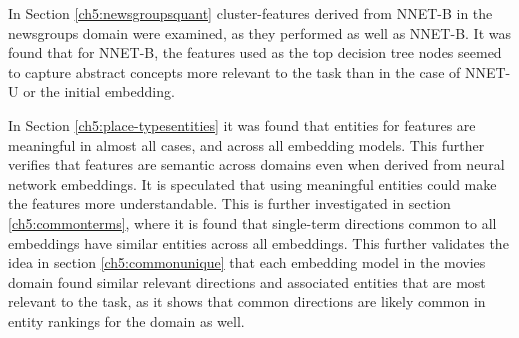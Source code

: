 In Section \ref{ch5:newsgroupsquant} cluster-features derived from NNET-B in the newsgroups domain were examined, as they performed as well as NNET-B. It was found that for NNET-B, the features used as the top decision tree nodes seemed to capture abstract concepts more relevant to the task than in the case of NNET-U or the initial embedding.

In Section \ref{ch5:place-typesentities} it was found that entities for features are meaningful in almost all cases, and across all embedding models. This further verifies that features are semantic across domains even when derived from neural network embeddings. It is speculated that using meaningful entities could make the features more understandable. This is further investigated in section \ref{ch5:commonterms}, where it is found that single-term directions common to all embeddings have similar entities across all embeddings. This further validates the idea in section \ref{ch5:commonunique} that each embedding model in the movies domain found similar relevant directions and associated entities that are most relevant to the task, as it shows that common directions are likely common in entity rankings for the domain as well.

















